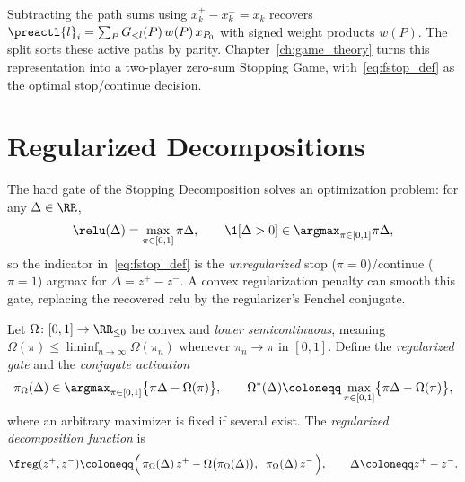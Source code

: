 Subtracting the path sums using $x_k^+-x_k^-=x_k$ recovers $\preactl{l}_i=\sum_P G_{<l}(P)\,w(P)\,x_{P_0}$ with signed weight products $w(P)$. The split sorts these active paths by parity. Chapter~\ref{ch:game_theory} turns this representation into a two-player zero-sum Stopping Game, with~\eqref{eq:fstop_def} as the optimal stop/continue decision.

\section{Regularized Decompositions}\label{sec:regularized_decompositions}

The hard gate of the Stopping Decomposition solves an optimization problem: for any $\Delta \in \RR$,
\begin{equation}
	\relu(\Delta) = \max_{\pi \in [0,1]} \pi \Delta,
	\qquad
	\1[\Delta > 0] \in \argmax_{\pi \in [0,1]} \pi \Delta,
	\label{eq:gate_as_argmax}
\end{equation}
so the indicator in~\eqref{eq:fstop_def} is the \emph{unregularized} stop ($\pi = 0$)/continue ($\pi = 1$) argmax for $\Delta = z^+ - z^-$. A convex regularization penalty can smooth this gate, replacing the recovered \ac{relu} by the regularizer's Fenchel conjugate.

\begin{definition}\label{def:freg}
Let $\Omega \colon [0,1] \to \RR_{\le 0}$ be convex and \emph{lower semicontinuous}, meaning $\Omega(\pi)\le\liminf_{n\to\infty}\Omega(\pi_n)$ whenever $\pi_n\to\pi$ in $[0,1]$. Define the \emph{regularized gate} and the \emph{conjugate activation}
\begin{equation}
	\pi_\Omega(\Delta) \in \argmax_{\pi \in [0,1]} \bigl\{ \pi \Delta - \Omega(\pi) \bigr\},
	\qquad
	\Omega^*(\Delta) \coloneqq \max_{\pi \in [0,1]} \bigl\{ \pi \Delta - \Omega(\pi) \bigr\},
	\label{eq:regularized_gate}
\end{equation}
where an arbitrary maximizer is fixed if several exist. The \emph{regularized decomposition function} is
\begin{equation}
	\freg(z^+, z^-) \coloneqq \Bigl(\, \pi_\Omega(\Delta)\, z^+ - \Omega\bigl(\pi_\Omega(\Delta)\bigr), \;\; \pi_\Omega(\Delta)\, z^- \,\Bigr),
	\qquad
	\Delta \coloneqq z^+ - z^-.
	\label{eq:freg_def}
\end{equation}
\end{definition}


